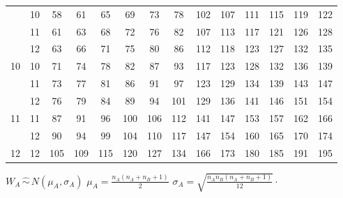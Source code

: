 \documentclass{article}
\begin{document}
\begin{center}
\begin{tabular}[t]{|c|c|*{6}{c}|*{6}{c}|}
     & 10 &  58 &  61 &  65 &  69 &  73 &  78 & 102 & 107 & 111 & 115 & 119 & 122 \\
     & 11 &  61 &  63 &  68 &  72 &  76 &  82 & 107 & 113 & 117 & 121 & 126 & 128 \\
     & 12 &  63 &  66 &  71 &  75 &  80 &  86 & 112 & 118 & 123 & 127 & 132 & 135 \\
  \hline
  10 & 10 &  71 &  74 &  78 &  82 &  87 &  93 & 117 & 123 & 128 & 132 & 136 & 139 \\
     & 11 &  73 &  77 &  81 &  86 &  91 &  97 & 123 & 129 & 134 & 139 & 143 & 147 \\
     & 12 &  76 &  79 &  84 &  89 &  94 & 101 & 129 & 136 & 141 & 146 & 151 & 154 \\
  \hline
  11 & 11 &  87 &  91 &  96 & 100 & 106 & 112 & 141 & 147 & 153 & 157 & 162 & 166 \\
     & 12 &  90 &  94 &  99 & 104 & 110 & 117 & 147 & 154 & 160 & 165 & 170 & 174 \\
  \hline
  12 & 12 & 105 & 109 & 115 & 120 & 127 & 134 & 166 & 173 & 180 & 185 & 191 & 195 \\
  \hline
  \end{tabular}

\end{center}

\medskip
{}\/
\(
  W_A\, \hat\sim\, N(\mu_A,\sigma_A)
\)
\/\/
$
  \displaystyle
   \mu_A = \frac{n_A(n_A+n_B+1)}{2}
$
\/\/
$
  \displaystyle
   \sigma_A = \sqrt{\frac{n_An_B(n_A+n_B+1)}{12}}\cdot
$
\end{document}
